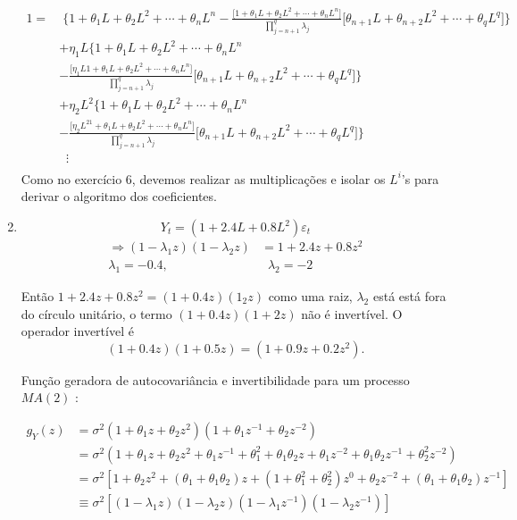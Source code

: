 \begin{enumerate}
\begin{align*}
	1=&\; \Bigg\{1+\theta_1L+\theta_2L^2+\cdots+\theta_nL^n-\frac{\bigg[1+\theta_1L+\theta_2L^2+\cdots+\theta_nL^n\bigg]}{\prod\limits_{j=n+1}^q\lambda_j}\bigg[\theta_{n+1}L+\theta_{n+2}L^2+\cdots+\theta_qL^q\bigg]\Bigg\}\\
	&+\eta_1L\Bigg\{1+\theta_1L+\theta_2L^2+\cdots+\theta_nL^n\\
	&-\frac{\bigg[\eta_1L1+\theta_1L+\theta_2L^2+\cdots+\theta_nL^n\bigg]}{\prod\limits_{j=n+1}^q\lambda_j}\bigg[\theta_{n+1}L+\theta_{n+2}L^2+\cdots+\theta_qL^q\bigg]\Bigg\}\\
	&+\eta_2L^2\Bigg\{1+\theta_1L+\theta_2L^2+\cdots+\theta_nL^n\\
	&-\frac{\bigg[\eta_2L^21+\theta_1L+\theta_2L^2+\cdots+\theta_nL^n\bigg]}{\prod\limits_{j=n+1}^q\lambda_j}\bigg[\theta_{n+1}L+\theta_{n+2}L^2+\cdots+\theta_qL^q\bigg]\Bigg\}\\
	&\;\;\vdots\\
\end{align*}
Como no exercício 6, devemos realizar as multiplicações e isolar os $L^i$'s para derivar o algoritmo dos coeficientes.
	
	\item[\fbox{3.8}]
	
	
		$$Y_t=(1+2.4L+0.8L^2)\varepsilon_t$$
	\begin{align*}
		\Rightarrow (1-\lambda_1z)(1-\lambda_2z)&=1+2.4z+0.8z^2\\
		\lambda_1=-0.4,&\;\;\lambda_2=-2
	\end{align*}

Então $1+2.4z+0.8z^2=(1+0.4z)(1_2z)$ como uma raiz, $\lambda_2$ está está fora do círculo unitário, o termo $(1+0.4z)(1+2z)$ não é invertível. O operador invertível é $$(1+0.4z)(1+0.5z)=(1+0.9z+0.2z^2).$$ 

	Função geradora de autocovariância e invertibilidade para um processo $MA(2)$ :

				\begin{align*}
					g_Y(z)&=\sigma^2(1+\theta_1z+\theta_2z^2)(1+\theta_1z^{-1}+\theta_2z^{-2})\\
					&=\sigma^2(1+\theta_1z+\theta_2z^2+\theta_1z^{-1}+\theta_1^2+\theta_1\theta_2z+\theta_1z^{-2}+\theta_1\theta_2z^{-1}+\theta_2^2z^{-2})\\
					&=\sigma^2[1+\theta_2z^2+(\theta_1+\theta_1\theta_2)z+(1+\theta_1^2+\theta_2^2)z^0+\theta_2z^{-2}+(\theta_1+\theta_1\theta_2)z^{-1}]\\
					&\equiv \sigma^2[(1-\lambda_1z)(1-\lambda_2z)(1-\lambda_1z^{-1})(1-\lambda_2z^{-1})]\\
				\end{align*}
				

\end{enumerate}
